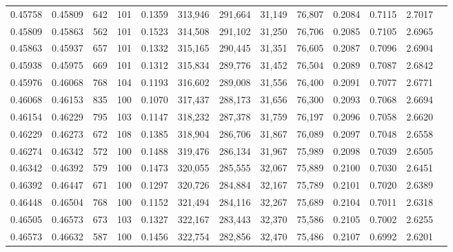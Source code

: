 \begin{tabular}{rrrrrrrrrrrrr}
0.45758 & 0.45809 &   642 & 101 &                                     0.1359 & 313,946 & 291,664 &  31,149 &  76,807 & 0.2084 & 0.7115 & 2.7017 \\
0.45809 & 0.45863 &   562 & 101 &                                     0.1523 & 314,508 & 291,102 &  31,250 &  76,706 & 0.2085 & 0.7105 & 2.6965 \\
0.45863 & 0.45937 &   657 & 101 &                                     0.1332 & 315,165 & 290,445 &  31,351 &  76,605 & 0.2087 & 0.7096 & 2.6904 \\
0.45938 & 0.45975 &   669 & 101 &                                     0.1312 & 315,834 & 289,776 &  31,452 &  76,504 & 0.2089 & 0.7087 & 2.6842 \\
0.45976 & 0.46068 &   768 & 104 &                                     0.1193 & 316,602 & 289,008 &  31,556 &  76,400 & 0.2091 & 0.7077 & 2.6771 \\
0.46068 & 0.46153 &   835 & 100 &                                     0.1070 & 317,437 & 288,173 &  31,656 &  76,300 & 0.2093 & 0.7068 & 2.6694 \\
0.46154 & 0.46229 &   795 & 103 &                                     0.1147 & 318,232 & 287,378 &  31,759 &  76,197 & 0.2096 & 0.7058 & 2.6620 \\
0.46229 & 0.46273 &   672 & 108 &                                     0.1385 & 318,904 & 286,706 &  31,867 &  76,089 & 0.2097 & 0.7048 & 2.6558 \\
0.46274 & 0.46342 &   572 & 100 &                                     0.1488 & 319,476 & 286,134 &  31,967 &  75,989 & 0.2098 & 0.7039 & 2.6505 \\
0.46342 & 0.46392 &   579 & 100 &                                     0.1473 & 320,055 & 285,555 &  32,067 &  75,889 & 0.2100 & 0.7030 & 2.6451 \\
0.46392 & 0.46447 &   671 & 100 &                                     0.1297 & 320,726 & 284,884 &  32,167 &  75,789 & 0.2101 & 0.7020 & 2.6389 \\
0.46448 & 0.46504 &   768 & 100 &                                     0.1152 & 321,494 & 284,116 &  32,267 &  75,689 & 0.2104 & 0.7011 & 2.6318 \\
0.46505 & 0.46573 &   673 & 103 &                                     0.1327 & 322,167 & 283,443 &  32,370 &  75,586 & 0.2105 & 0.7002 & 2.6255 \\
0.46573 & 0.46632 &   587 & 100 &                                     0.1456 & 322,754 & 282,856 &  32,470 &  75,486 & 0.2107 & 0.6992 & 2.6201 \\

\end{tabular}
